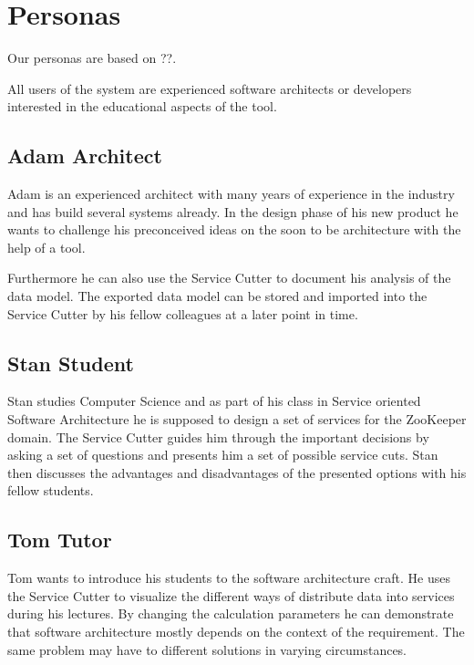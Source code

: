 
\section{Personas}

Our personas are based on ??. %

All users of the system are experienced software architects or developers interested in the educational aspects of the tool.

\subsection{Adam Architect}

Adam is an experienced architect with many years of experience in the industry and has build several systems already. In the design phase of his new product he wants to challenge his preconceived ideas on the soon to be architecture with the help of a tool. 

Furthermore he can also use the Service Cutter to document his analysis of the data model. The exported data model can be stored and imported into the Service Cutter by his fellow colleagues at a later point in time.

\subsection{Stan Student}

Stan studies Computer Science and as part of his class in Service oriented Software Architecture he is supposed to design a set of services for the ZooKeeper domain. The Service Cutter guides him through the important decisions by asking a set of questions and presents him a set of possible service cuts. Stan then discusses the advantages and disadvantages of the presented options with his fellow students.

\subsection{Tom Tutor}

Tom wants to introduce his students to the software architecture craft. He uses the Service Cutter to visualize the different ways of distribute data into services during his lectures. By changing the calculation parameters he can demonstrate that software architecture mostly depends on the context of the requirement. The same problem may have to different solutions in varying circumstances.
